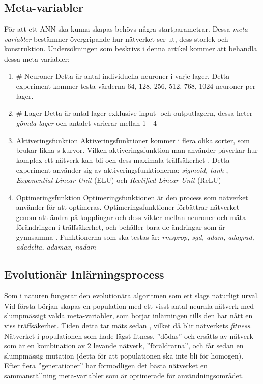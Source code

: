 \documentclass[a4paper, 11pt]{article}
\begin{document}
    \subsection{Meta-variabler}
    För att ett ANN ska kunna skapas behövs några startparametrar. Dessa \textit{meta-variabler} bestämmer övergripande hur nätverket ser ut, dess storlek och konstruktion. Undersökningen som beskrivs i denna artikel kommer att behandla dessa meta-variabler:
    \begin{enumerate}
      \item \# Neuroner
      \newline
      Detta är antal individuella neuroner i varje lager. Detta experiment kommer testa värderna 64, 128, 256, 512, 768, 1024 neuroner per lager.
      \item \# Lager
      \newline
      Detta är antal lager exklusive input- och outputlagern, dessa heter \textit{gömda lager} och antalet varierar mellan 1 - 4
      \item Aktiveringsfunktion
      \newline
      Aktiveringsfunktioner kommer i flera olika sorter, som brukar likna s kurvor. Vilken aktiveringsfunktion man använder påverkar hur komplex ett nätverk kan bli och dess maximala träffsäkerhet \parencite{jain1996artificial}. Detta experiment använder sig av aktiveringsfunktionerna: \textit{sigmoid, tanh} \parencite{karlik2011performance}, \textit{Exponential Linear Unit} (ELU) \parencite{clevert2015fast} och \textit{Rectified Linear Unit} (ReLU) \parencite{xu2015empirical}
      \item Optimeringsfunktion
      \newline
      Optimeringsfunktionen är den process som nätverket använder för att optimeras. Optimeringsfunktioner förbättrar nätverket genom att ändra på kopplingar och dess vikter mellan neuroner och mäta förändringen i träffsäkerhet, och behåller bara de ändringar som är gynnsamma \parencite{TypesofO34:online}. Funktionerna som ska testas är: \textit{rmsprop, sgd, adam, adagrad, adadelta, adamax, nadam} \parencite{kingma2014adam}
    \end{enumerate}


    \subsection{Evolutionär Inlärningsprocess}
    Som i naturen fungerar den evolutionära algoritmen som ett slags naturligt urval. Vid första början skapas en population med ett visst antal neurala nätverk med slumpmässigt valda meta-variabler, som borjar inlärningen tills den har nått en viss träffsäkerhet. Tiden detta tar mäts sedan , vilket då blir nätverkets \textit{fitness}. Nätverket i populationen som hade lägst fitness, ”dödas” och ersätts av nätverk som är en kombination av 2 levande nätverk, ”föräldrarna”, och får sedan en slumpmässig mutation (detta för att populationen ska inte bli för homogen). Efter flera ”generationer” har förmodligen det bästa nätverket en sammanställning meta-variabler som är optimerade för användningsområdet. \parencite{yao1997new}
\end{document}
